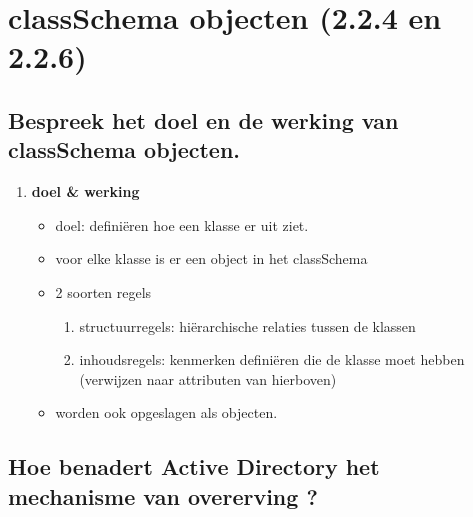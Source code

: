 \chapter{classSchema objecten (2.2.4 en 2.2.6)}
\section{Bespreek het doel en de werking van classSchema objecten.}
\begin{enumerate}
\item \textbf{doel \& werking}
\begin{itemize}
\item doel: defini\"eren hoe een klasse er uit ziet.
\item voor elke klasse is er een object in het classSchema
\item 2 soorten regels
\begin{enumerate}
\item structuurregels: hi\"erarchische relaties tussen de klassen
\item inhoudsregels: kenmerken defini\"eren die de klasse moet hebben (verwijzen naar attributen van hierboven)
\end{enumerate}
\item worden ook opgeslagen als objecten.
\end{itemize}
\end{enumerate}

\section{Hoe benadert Active Directory het mechanisme van overerving ?}

